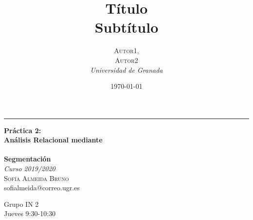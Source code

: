 \documentclass[a4paper, 20pt]{article}
\title{\textbf{Título}\\ %
Subtítulo} %
\author{\textsc{Autor1,\\Autor2} %
\\{\textit{Universidad de Granada}}} %
\date{\today} %
\begin{document}

\begin{titlepage} %
	
	\raggedleft %
	
	\rule{1pt}{\textheight} %
	\hspace{0.05\textwidth} %
	\parbox[b]{0.8\textwidth}{ %
		
		{\Huge\bfseries Práctica 2:\\[0.5\baselineskip] Análisis Relacional mediante\\ \\ Segmentación}\\[2\baselineskip] %
		{\large\textit{Curso 2019/2020}}\\[4\baselineskip] %
		{\Large\textsc{Sofía Almeida Bruno}\\[0.5\baselineskip]sofialmeida@correo.ugr.es} %
		
		\vspace{0.4\textheight} %
		
		{\noindent Grupo IN 2\\[0.5\baselineskip] Jueves 9:30-10:30}\\[\baselineskip] %
	}

\end{titlepage}


\end{document}
